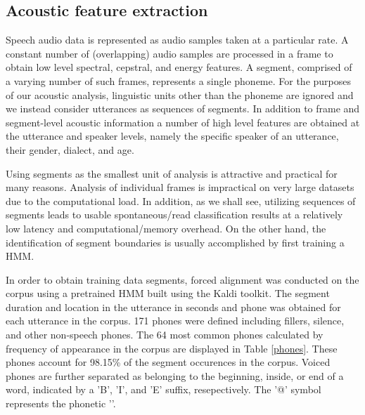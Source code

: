 \documentclass[conference]{IEEEtran}
\begin{document}
\subsection{Acoustic feature extraction}

Speech audio data is represented as audio samples taken at a particular rate.
A constant number of (overlapping) audio samples are processed in a frame to obtain low level spectral, cepstral, and energy features.
A segment, comprised of a varying number of such frames, represents a single phoneme.
For the purposes of our acoustic analysis, linguistic units other than the phoneme are ignored and we instead consider utterances as sequences of segments.
In addition to frame and segment-level acoustic information a number of high level features are obtained at the utterance and speaker levels, namely the specific speaker of an utterance, their gender, dialect, and age.

Using segments as the smallest unit of analysis is attractive and practical for many reasons.
Analysis of individual frames is impractical on very large datasets due to the computational load.
In addition, as we shall see, utilizing sequences of segments leads to usable spontaneous/read classification results at a relatively low latency and computational/memory overhead.
On the other hand, the identification of segment boundaries is usually accomplished by first training a HMM.

In order to obtain training data segments, forced alignment was conducted on the corpus using a pretrained HMM built using the Kaldi toolkit.
The segment duration and location in the utterance in seconds and phone was obtained for each utterance in the corpus.
171 phones were defined including fillers, silence, and other non-speech phones.
The 64 most common phones calculated by frequency of appearance in the corpus are displayed in Table \ref{phones}.
These phones account for 98.15\% of the segment occurences in the corpus.
Voiced phones are further separated as belonging to the beginning, inside, or end of a word, indicated by a 'B', 'I', and 'E' suffix, resepectively.
The '@' symbol represents the phonetic ''.
\end{document}
